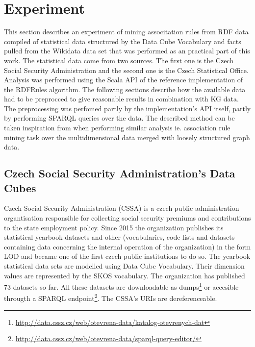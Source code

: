 \chapter{Experiment}


This section describes an experiment of mining associtation rules from RDF data compiled of statistical data structured by the Data Cube Vocabulary and facts pulled from the Wikidata data set that was performed as an practical part of this work. The statistical data come from two sources. The first one is the Czech Social Security Administration and the second one is the Czech Statistical Office. Analysis was performed using the Scala API of the reference implementation of the RDFRules algorithm. The following sections describe how the available data had to be preprocced to give reasonable results in combination with KG data. The preprocessing was perfomed partly by the implementation's API itself, partly by performing SPARQL queries over the data. The described method can be taken inspiration from when performing similar analysis ie. association rule mining task over the multidimensional data merged with loosely structured graph data. 

\section{Czech Social Security Administration's Data Cubes}

Czech Social Security Administration (CSSA) is a czech public administration organtisation responsible for collecting social security premiums and contributions to the state employment policy. Since 2015 the organization publishes its statistical yearbook datasets and other (vocabularies, code lists and datasets containing data concerning the internal operation of the organization) in the form LOD and became one of the first czech public institutions to do so. The yearbook statistical data sets are modelled using Data Cube Vocabulary. Their dimension values are represented by the SKOS vocabulary. The organization has published 73 datasets so far. All these datasets are downloadable as dumps\footnote{\href{http://data.cssz.cz/web/otevrena-data/katalog-otevrenych-dat}{http://data.cssz.cz/web/otevrena-data/katalog-otevrenych-dat}} or accesible througth a SPARQL endpoint\footnote{\href{http://data.cssz.cz/web/otevrena-data/sparql-query-editor/}{http://data.cssz.cz/web/otevrena-data/sparql-query-editor/}}. The CSSA's URIs are dereferenceable.

